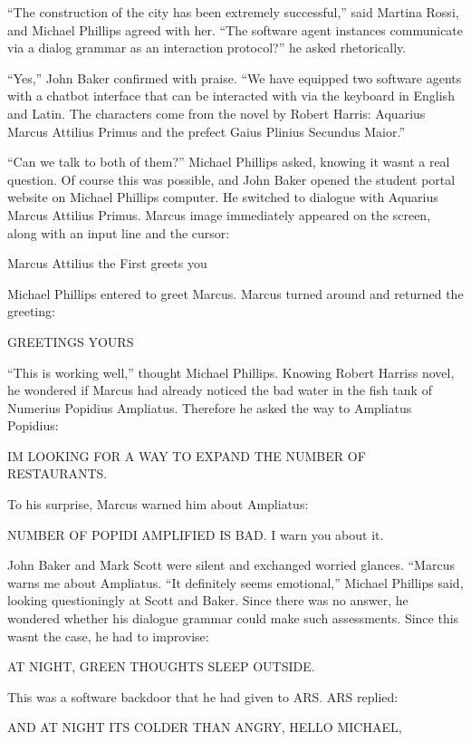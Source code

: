 \documentclass[
]{article}
\begin{document}
``The construction of the city has been extremely successful,'' said
Martina Rossi, and Michael Phillips agreed with her. ``The software
agent instances communicate via a dialog grammar as an interaction
protocol?'' he asked rhetorically.

``Yes,'' John Baker confirmed with praise. ``We have equipped two
software agents with a chatbot interface that can be interacted with via
the keyboard in English and Latin. The characters come from the novel by
Robert Harris: Aquarius Marcus Attilius Primus and the prefect Gaius
Plinius Secundus Maior.''

``Can we talk to both of them?'' Michael Phillips asked, knowing it
wasn\textquotesingle t a real question. Of course this was possible, and
John Baker opened the student portal website on Michael
Phillips\textquotesingle{} computer. He switched to dialogue with
Aquarius Marcus Attilius Primus. Marcus\textquotesingle{} image
immediately appeared on the screen, along with an input line and the
cursor:

Marcus Attilius the First greets you

Michael Phillips entered to greet Marcus. Marcus turned around and
returned the greeting:

GREETINGS YOURS

``This is working well,'' thought Michael Phillips. Knowing Robert
Harris\textquotesingle s novel, he wondered if Marcus had already
noticed the bad water in the fish tank of Numerius Popidius Ampliatus.
Therefore he asked the way to Ampliatus Popidius:

I\textquotesingle M LOOKING FOR A WAY TO EXPAND THE NUMBER OF
RESTAURANTS.

To his surprise, Marcus warned him about Ampliatus:

NUMBER OF POPIDI AMPLIFIED IS BAD. I warn you about it.

John Baker and Mark Scott were silent and exchanged worried glances.
``Marcus warns me about Ampliatus. ``It definitely seems emotional,''
Michael Phillips said, looking questioningly at Scott and Baker. Since
there was no answer, he wondered whether his dialogue grammar could make
such assessments. Since this wasn\textquotesingle t the case, he had to
improvise:

AT NIGHT, GREEN THOUGHTS SLEEP OUTSIDE.

This was a software backdoor that he had given to ARS. ARS replied:

AND AT NIGHT IT\textquotesingle S COLDER THAN ANGRY, HELLO MICHAEL,
\end{document}
